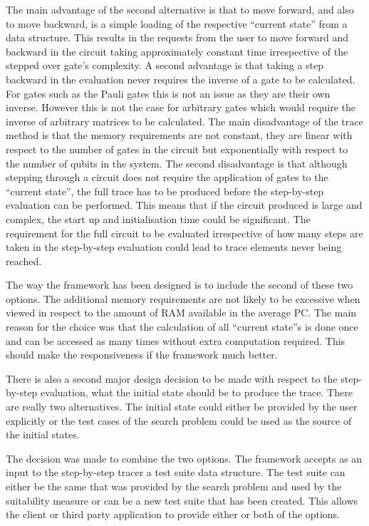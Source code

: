 The main advantage of the second alternative is that to move forward, and also to move backward, is a simple loading of the respective ``current state'' from a data structure.
This results in the requests from the user to move forward and backward in the circuit taking approximately constant time irrespective of the stepped over gate's complexity.
A second advantage is that taking a step backward in the evaluation never requires the inverse of a gate to be calculated.
For gates such as the Pauli gates this is not an issue as they are their own inverse.
However this is not the case for arbitrary gates which would require the inverse of arbitrary matrices to be calculated.
The main disadvantage of the trace method is that the memory requirements are not constant, they are linear with respect to the number of gates in the circuit but exponentially with respect to the number of qubits in the system.
The second disadvantage is that although stepping through a circuit does not require the application of gates to the ``current state'', the full trace has to be produced before the step-by-step evaluation can be performed.
This means that if the circuit produced is large and complex, the start up and initialisation time could be significant.
The requirement for the full circuit to be evaluated irrespective of how many steps are taken in the step-by-step evaluation could lead to trace elements never being reached.

The way the framework has been designed is to include the second of these two options.
The additional memory requirements are not likely to be excessive when viewed in respect to the amount of RAM available in the average PC.
The main reason for the choice was that the calculation of all ``current state''s is done once and can be accessed as many times without extra computation required.
This should make the responsiveness if the framework much better.

There is also a second major design decision to be made with respect to the step-by-step evaluation, what the initial state should be to produce the trace.
There are really two alternatives.
The initial state could either be provided by the user explicitly or the test cases of the search problem could be used as the source of the initial  states.

The decision was made to combine the two options.
The framework accepts as an input to the step-by-step tracer a test suite data structure.
The test suite can either be the same that was provided by the search problem and used by the suitability measure or can be a new test suite that has been created.
This allows the client or third party application to provide either or both of the options.

